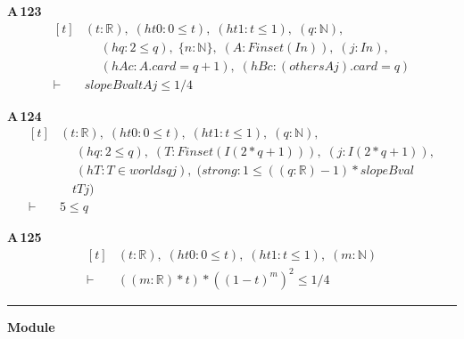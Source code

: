 \noindent\textbf{A\,123}\quad{}
{\footnotesize\[ \begin{aligned}[t]
&(\mathit{t} : \mathbb{R} ),\; (\mathit{ht0} : 0 \leq \mathit{t}),\; (\mathit{ht1} : \mathit{t} \leq 1),\; (\mathit{q} : \mathbb{N} ),\\
&\quad \; (\mathit{hq} : 2 \leq \mathit{q}),\; \{ \mathit{n} : \mathbb{N} \},\; (\mathit{A} : \mathit{Finset} (\mathit{I} \mathit{n})),\; (\mathit{j} : \mathit{I} \mathit{n}),\\
&\quad \; (\mathit{hAc} : \mathit{A}.\mathit{card}=\mathit{q}+1),\; (\mathit{hBc} : (\mathit{others} \mathit{A} \mathit{j}).\mathit{card}=\mathit{q})\\
\vdash\;&\mathit{slopeBval} \mathit{t} \mathit{A} \mathit{j} \leq 1/4
\end{aligned} \]}

\noindent\textbf{A\,124}\quad{}
{\footnotesize\[ \begin{aligned}[t]
&(\mathit{t} : \mathbb{R} ),\; (\mathit{ht0} : 0 \leq \mathit{t}),\; (\mathit{ht1} : \mathit{t} \leq 1),\; (\mathit{q} : \mathbb{N} ),\\
&\quad \; (\mathit{hq} : 2 \leq \mathit{q}),\; (\mathit{T} : \mathit{Finset} (\mathit{I} (2*\mathit{q}+1))),\; (\mathit{j} : \mathit{I} (2*\mathit{q}+1)),\\
&\quad \; (\mathit{hT} : \mathit{T} \in \mathit{worlds} \mathit{q} \mathit{j}),\; (\mathit{strong} : 1 \leq ((\mathit{q}:\mathbb{R} )-1)*\mathit{slopeBval}\\
&\quad \mathit{t} \mathit{T} \mathit{j})\\
\vdash\;&5 \leq \mathit{q}
\end{aligned} \]}

\noindent\textbf{A\,125}\quad{}
{\footnotesize\[ \begin{aligned}[t]
&(\mathit{t} : \mathbb{R} ),\; (\mathit{ht0} : 0 \leq \mathit{t}),\; (\mathit{ht1} : \mathit{t} \leq 1),\; (\mathit{m} : \mathbb{N} )\\
\vdash\;&((\mathit{m}:\mathbb{R} )*\mathit{t})*((1-\mathit{t})^{\mathit{m}})^{2} \leq 1/4
\end{aligned} \]}

\vspace{4pt}\noindent\rule{\columnwidth}{0.4pt}\par\vspace{2pt}
\noindent\textbf{Module }\par\vspace{3pt}

